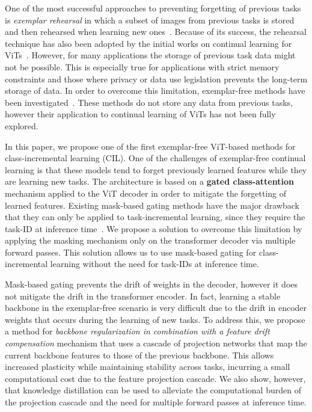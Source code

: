 \documentclass[twocolumn]{svjour3}          %
\begin{document}
One of the most successful approaches to preventing forgetting of previous tasks is \emph{exemplar rehearsal} in which a subset of images from previous tasks is stored and then rehearsed when learning new ones~\citep{bang2021rainbow,buzzega2020dark,buzzega2021rethinking, chaudhry2018efficient, riemer2018learning, rebuffi2017icarl, lopez2017gradient}. Because of its success, the rehearsal technique has also been adopted by the initial works on continual learning for ViTs~\citep{douillard2022dytox,wang2022continual}. However, for many applications the storage of previous task data might not be possible. This is especially true for applications with strict memory constraints and those where privacy or data use legislation prevents the long-term storage of data. In order to overcome this limitation, exemplar-free methods have been investigated~\citep{kirkpatrick2017overcoming,li2017learning,yan2021dynamically,yu2020semantic}. These methods do not store any data from previous tasks, however their application to continual learning of ViTs has not been fully explored. 

In this paper, we propose one of the first exemplar-free ViT-based methods for class-incremental learning (CIL).  
One of the challenges of exemplar-free continual learning is that these models tend to forget previously learned features while they are learning new tasks. 
The architecture is based on a \textbf{gated class-attention} mechanism applied to the ViT decoder in order to mitigate the forgetting of learned features. Existing mask-based gating methods have the major drawback that they can only be applied to task-incremental learning, since they require the task-ID at inference time~\citep{abati2020conditional, del2020ratt, serra2018overcoming}. 
We propose a solution to overcome this limitation by applying the masking mechanism only on the transformer decoder via multiple forward passes.
This solution allows us to use mask-based gating for class-incremental learning without the need for task-IDs at inference time.

Mask-based gating prevents the drift of weights in the decoder, however it does not mitigate the drift in the transformer encoder. In fact, learning a stable backbone in the exemplar-free scenario is very difficult due to the drift in encoder weights that occurs during the learning of new tasks. To address this, we propose a method for \emph{backbone regularization in combination with a feature drift compensation} mechanism that uses a cascade of projection networks that map the current backbone features to those of the previous backbone. This allows increased plasticity while maintaining stability across tasks, incurring a small computational cost due to the feature projection cascade. We also show, however, that knowledge distillation can be used to alleviate the computational burden of the projection cascade and the need for multiple forward passes at inference time. 
\end{document}
